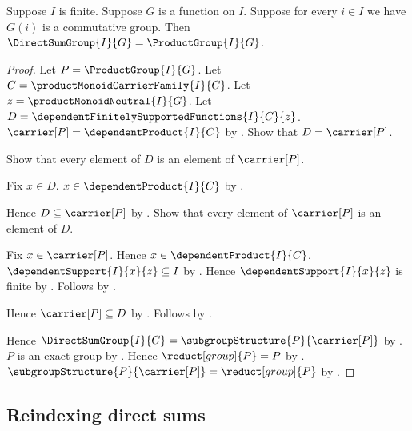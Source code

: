 \begin{theorem}\label{finite_direct_sum_group_eq_product_group}
    Suppose $I$ is finite.
    Suppose $G$ is a function on $I$.
    Suppose for every $i\in I$ we have $G(i)$ is a commutative group.
    Then $\DirectSumGroup{I}{G}=\ProductGroup{I}{G}$.
\end{theorem}
\begin{proof}
    Let $P=\ProductGroup{I}{G}$.
    Let $C=\productMonoidCarrierFamily{I}{G}$.
    Let $z=\productMonoidNeutral{I}{G}$.
    Let $D=\dependentFinitelySupportedFunctions{I}{C}{z}$.
    $\carrier[P]=\dependentProduct{I}{C}$ by
        .
    Show that $D=\carrier[P]$.
    \begin{subproof}
        Show that every element of $D$ is an element of $\carrier[P]$.
        \begin{subproof}
            Fix $x\in D$.
            $x\in\dependentProduct{I}{C}$ by
                .
        \end{subproof}
        Hence $D\subseteq\carrier[P]$ by .
        Show that every element of $\carrier[P]$ is an element of $D$.
        \begin{subproof}
            Fix $x\in\carrier[P]$.
            Hence $x\in\dependentProduct{I}{C}$.
            $\dependentSupport{I}{x}{z}\subseteq I$ by
                .
            Hence $\dependentSupport{I}{x}{z}$ is finite by
                .
            Follows by
                .
        \end{subproof}
        Hence $\carrier[P]\subseteq D$ by .
        Follows by .
    \end{subproof}
    Hence $\DirectSumGroup{I}{G}
        =\subgroupStructure{P}{\carrier[P]}$ by
        .
    $P$ is an exact group by
        .
    Hence $\reduct[group]{P}=P$ by .
    $\subgroupStructure{P}{\carrier[P]}=\reduct[group]{P}$ by
        .
\end{proof}

\subsection{Reindexing direct sums}

